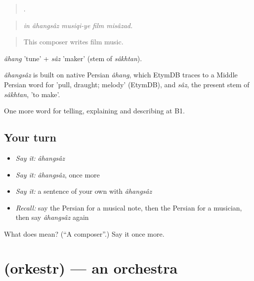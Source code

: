 \begin{quote}
    .
\end{quote}

\begin{quote}
\emph{in âhangsâz musiqi-ye film misâzad.}
\end{quote}

\begin{quote}
This composer writes film music.
\end{quote}

\emph{âhang} 'tune' + \emph{sâz} 'maker' (stem of \emph{sâkhtan}).

\begin{cousinweb}
\emph{âhangsâz} is built on native Persian \emph{âhang}, which EtymDB traces to a Middle Persian word for 'pull, draught; melody' (EtymDB), and \emph{sâz}, the present stem of \emph{sâkhtan}, 'to make'.
\end{cousinweb}

\begin{grammarlens}[title={What you've built}]
One more word for telling, explaining and describing at B1.
\end{grammarlens}

\subsection*{Your turn}
\begin{itemize}
\raggedright
  \item \emph{Say it:} \emph{âhangsâz}
  \item \emph{Say it:} \emph{âhangsâz}, once more
  \item \emph{Say it:} a sentence of your own with \emph{âhangsâz}
  \item \emph{Recall:} say the Persian for a musical note, then the Persian for a musician, then say \emph{âhangsâz} again
\end{itemize}

\begin{tcolorbox}[breakable,colback=teal!4,colframe=teal!35!black,title={Before you move on}]
What does  mean? (\textquotedblleft{}A composer\textquotedblright{}.) Say it once more.
\end{tcolorbox}
\section[\texorpdfstring{\fa{ارکستر} (orkestr)}{ارکستر (orkestr)}]{ (orkestr) — an orchestra}

